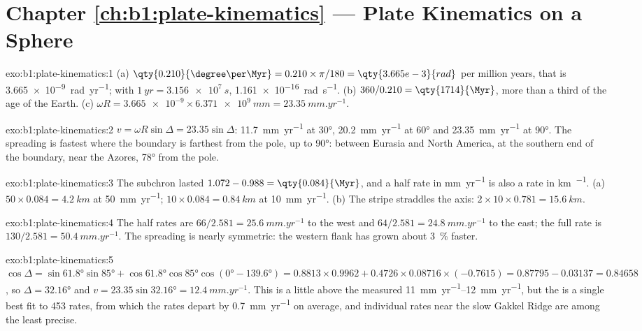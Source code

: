 \section*{Chapter \ref{ch:b1:plate-kinematics} --- Plate Kinematics on a Sphere}

\begin{solution}{exo:b1:plate-kinematics:1}
(a) $\qty{0.210}{\degree\per\Myr} = 0.210\times\pi/180 = \qty{3.665e-3}{rad}$
per million years, that is \qty{3.665e-9}{rad.yr^{-1}}; with
$\qty{1}{yr} = \qty{3.156e7}{s}$, \qty{1.161e-16}{rad.s^{-1}}. (b) $360/0.210 =
\qty{1714}{\Myr}$, more than a third of the age of the Earth. (c) $\omega R =
\num{3.665e-9}\times\qty{6.371e9}{mm} = \qty{23.35}{mm.yr^{-1}}$.
\end{solution}

\begin{solution}{exo:b1:plate-kinematics:2}
$v = \omega R\sin\Delta = 23.35\sin\Delta$: \qty{11.7}{mm.yr^{-1}} at \ang{30},
\qty{20.2}{mm.yr^{-1}} at \ang{60} and \qty{23.35}{mm.yr^{-1}} at \ang{90}. The
spreading is fastest where the boundary is farthest from the pole, up to
\ang{90}: between Eurasia and North America, at the southern end of the
boundary, near the Azores, \ang{78} from the pole.
\end{solution}

\begin{solution}{exo:b1:plate-kinematics:3}
The subchron lasted $1.072 - 0.988 = \qty{0.084}{\Myr}$, and a half rate in
\unit{mm.yr^{-1}} is also a rate in \unit{km\per\Myr}. (a) $50\times0.084 =
\qty{4.2}{km}$ at \qty{50}{mm.yr^{-1}}; $10\times0.084 = \qty{0.84}{km}$ at
\qty{10}{mm.yr^{-1}}. (b) The stripe straddles the axis:
$2\times10\times0.781 = \qty{15.6}{km}$.
\end{solution}

\begin{solution}{exo:b1:plate-kinematics:4}
The half rates are $66/2.581 = \qty{25.6}{mm.yr^{-1}}$ to the west and
$64/2.581 = \qty{24.8}{mm.yr^{-1}}$ to the east; the full rate is
$130/2.581 = \qty{50.4}{mm.yr^{-1}}$. The
spreading is nearly symmetric: the western flank has grown about
\qty{3}{\percent} faster.
\end{solution}

\begin{solution}{exo:b1:plate-kinematics:5}
$\cos\Delta = \sin\ang{61.8}\sin\ang{85} + \cos\ang{61.8}\cos\ang{85}
\cos(\ang{0} - \ang{139.6}) = 0.8813\times0.9962 + 0.4726\times0.08716\times
(-0.7615) = 0.87795 - 0.03137 = 0.84658$, so $\Delta = \ang{32.16}$ and
$v = 23.35\sin\ang{32.16} = \qty{12.4}{mm.yr^{-1}}$. This is a little above the
measured \qtyrange{11}{12}{mm.yr^{-1}}, but the  is a single best
fit to 453 rates, from which the rates depart by \qty{0.7}{mm.yr^{-1}} on
average, and individual rates near the slow Gakkel Ridge are among the least
precise.
\end{solution}

